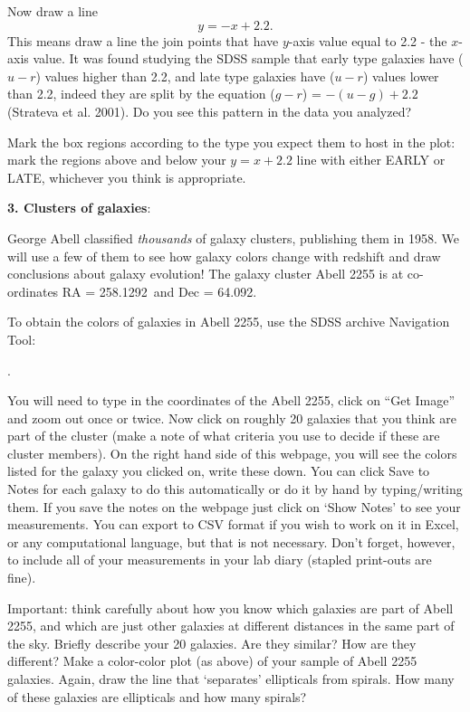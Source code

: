 \clearpage

\noindent
Now draw a line $$y=-x+2.2.$$ This means draw a line the join points
that have $y$-axis value equal to 2.2 - the $x$-axis value. It was
found studying the SDSS sample that early type galaxies have ($u-r$)
values higher than 2.2, and late type galaxies have ($u-r$) values
lower than 2.2, indeed they are split by the equation ($g-r$) = $- (u-g)
+ 2.2$ (Strateva et al. 2001). Do you see this pattern in the data you analyzed? 

\bigskip
\noindent
Mark the box regions according to the type you expect them to host in the plot: mark the regions above and below your $y=x+2.2$ line with either EARLY or LATE, whichever you think is appropriate. 


\noindent
{\bf 3. Clusters of galaxies}:

\noindent
George Abell classified \emph{thousands} of galaxy clusters, publishing them in 1958. We will use a few of them to see how galaxy colors change with redshift and draw conclusions about galaxy evolution!
The galaxy cluster Abell 2255 is at co-ordinates RA = 258.1292\deg\  and Dec = 64.092\deg .

\noindent
To obtain the colors of galaxies in Abell 2255, use the SDSS archive Navigation Tool: 

.

\noindent
You will need to type in the coordinates of the Abell 2255, click on ``Get Image'' and zoom out once or twice. Now click on roughly 20 galaxies that you think are part of the cluster (make a note of what criteria you use to decide if these are cluster members). On the right hand side of this webpage, you will see the colors listed for the galaxy you clicked on, write these down. You can click Save to Notes for each galaxy to do this automatically or do it by hand by typing/writing them. If you save the notes on the webpage just click on ‘Show Notes’ to see your measurements. You can export to CSV format if you wish to work on it in Excel, or any computational language, but that is not necessary.
Don’t forget, however, to include all of your measurements in your lab diary (stapled print-outs are fine).

\noindent
Important: think carefully about how you know which galaxies are part of Abell 2255, and which are just other galaxies at different distances in the same part of the sky. Briefly describe your 20 galaxies. Are they similar? How are they different? Make a color-color plot (as above) of your sample of Abell 2255 galaxies. Again, draw the line that ‘separates’ ellipticals from spirals. How many of these galaxies are ellipticals and how many spirals?



